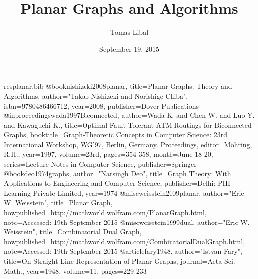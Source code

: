 \begin{filecontents*}{resplanar.bib}
@book{nishizeki2008planar,
    title={Planar Graphs: Theory and Algorithms},
    author="Takao {Nishizeki} and Norishige {Chiba}",
    isbn={9780486466712},
    year={2008},
    publisher={Dover Publications}
  }
  @inproceedings{wada1997Biconnected,
    author={Wada K. and Chen W. and Luo Y. and Kawaguchi K.},
    title={Optimal Fault-Tolerant ATM-Routings for Biconnected Graphs},
    booktitle={Graph-Theoretic Concepts in Computer Science: 23rd International Workshop, WG'97, Berlin, Germany. Proceedings},
    editor={M{\"o}hring, R.H.},
    year={1997},
    volume={23rd},
    pages={354-358},
    month={June 18-20},
    series={Lecture Notes in Computer Science},
    publisher={Springer}
  }
  @book{deo1974graphs,
    author="Narsingh {Deo}",
    title={Graph Theory: With Applications to Engineering and Computer Science},
    publisher={Delhi: PHI Learning Private Limited},
    year={1974}
  }
  @misc{weisstein2009planar,
    author="Eric W. {Weisstein}",
    title={Planar Graph},
    howpublished={\url{http://mathworld.wolfram.com/PlanarGraph.html}},
    note={Accessed: 19th September 2015}
  }
  @misc{weisstein1999dual,
    author="Eric W. {Weisstein}",
    title={Combinatorial Dual Graph},
    howpublished={\url{http://mathworld.wolfram.com/CombinatorialDualGraph.html}},
    note={Accessed: 19th September 2015}
  }
  @article{fary1948,
    author="Istvan {Fary}",
    title={On Straight Line Representation of Planar Graphs},
    journal={Acta Sci. Math.},
    year={1948},
    volume={11},
    pages={229-233}
    }
\end{filecontents*}

\documentclass[11pt]{article}

\usepackage[backend=biber]{biblatex}


\title{Planar Graphs and Algorithms}
\author{Tomas Libal}
\date{September 19, 2015}



\maketitle

Planar graph is a graph that can be drawn geometrically on a plane without edge crossings (other than edge
crossings at the vertices). This is called \textit{embedding on a plane}~\autocite[90]{deo1974graphs}. Nishizeki
and Chiba~\autocite[11]{nishizeki2008planar} give a corollary which says that a planar graph has no vertex of
degree $ > 5 $.

